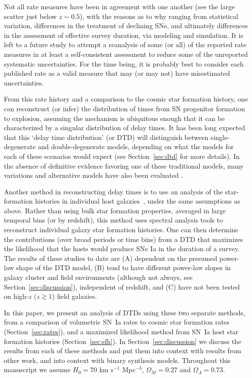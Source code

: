 \documentclass[apj, twocolumn]{aastex62}
\begin{document}
Not all rate measures have been in agreement with one another (see the large scatter just below $z\sim0.5$), with the reasons as to why ranging from statistical variation, differences in the treatment of declining SNe, and ultimately differences in the assessment of effective survey duration, via modeling and simulation. It is left to a future study to attempt a reanalysis of some (or all) of the reported rate measures in at least a self-consistent assessment to reduce some of the unreported systematic uncertainties. For the time being, it is probably best to consider each published rate as a valid measure that may (or may not) have misestimated uncertainties. 

From this rate history and a comparison to the cosmic star formation history, one can reconstruct (or infer) the distribution of times from SN progenitor formation to explosion, assuming the mechanism is ubiquitous enough that it can be characterized by a singular distribution of delay times. It has been long expected that this `delay time distribution' (or DTD) will distinguish between single-degenerate \citep{Whelan:1973,Nomoto:1982vh} and double-degenerate \citep{Iben:1984, Webbink:1984} models, depending on what the models for each of these scenarios would expect (see Section~\ref{sec:dtd} for more details). {In the absence of definitive evidence favoring one of these traditional models, many variations and alternative models have also been evaluated \citep{Maoz:2014fj, Livio:2018rz}.}

Another method in reconstructing delay times is to use an analysis of the star-formation histories in individual host galaxies~\citep{Brandt:2010, Maoz:2011, Maoz:2012a}, under the same assumptions as above. Rather than using bulk star formation properties, averaged in large temporal bins (or by redshift), this method uses spectral analysis tools to reconstruct individual galaxy star formation histories. One can then determine the contributions (over broad periods or time bins) from a DTD that maximizes the likelihood that the hosts would produce SNe Ia in the duration of a survey. The results of these studies to date are (A) dependent on the presumed power-law shape of the DTD model, (B) tend to have different power-law slopes in galaxy cluster and field environments {(although not always, see Section~\ref{sec:discussion})}, independent of redshift, and (C) have not been tested on high-$z$ ($z\gtrsim1$) field galaxies. 

In this paper, we present an analysis of DTDs using these two separate methods, from a comparison of volumetric SN~Ia rates to cosmic star formation rates (Section~\ref{sec:rates}), and a maximized likelihood method from SN~Ia host star formation histories (Section~\ref{sec:sfh}). In Section~\ref{sec:discussion} we discuss the results from each of these methods and put them into context with results from other work, and into context with binary synthesis models. Throughout this manuscript we assume $H_0=70$ km s$^{-1}$ Mpc$^{-3}$, $\Omega_M=0.27$ and $\Omega_\Lambda=0.73$. 
\end{document}
